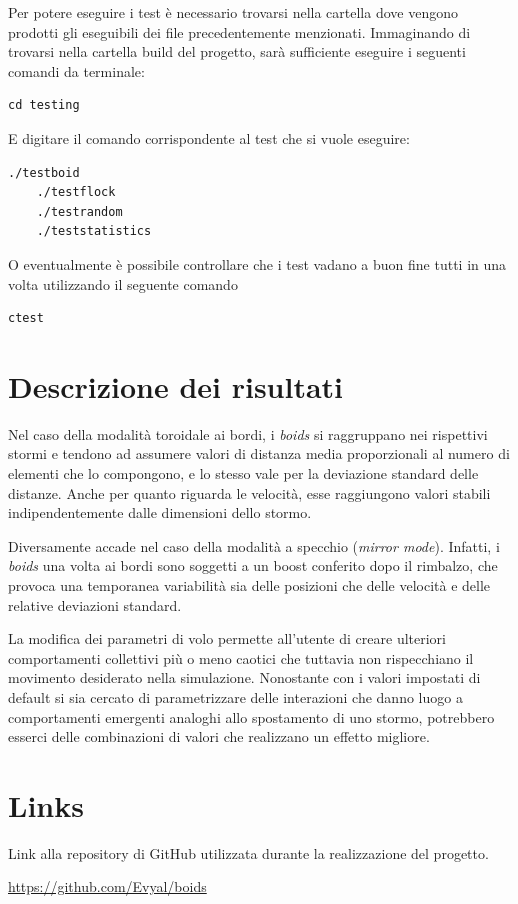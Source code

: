 \documentclass[10pt,a4paper]{article}
\begin{document}
Per potere eseguire i test è necessario trovarsi nella cartella dove vengono prodotti gli eseguibili dei file precedentemente menzionati. Immaginando di trovarsi nella cartella build del progetto, sarà sufficiente eseguire i seguenti comandi da terminale:

\begin{lstlisting}[style=github-bash]
    cd testing
\end{lstlisting}

E digitare il comando corrispondente al test che si vuole eseguire:

\begin{lstlisting}[style=github-bash]
    ./testboid
    ./testflock
    ./testrandom
    ./teststatistics
\end{lstlisting}

O eventualmente è possibile controllare che i test vadano a buon fine tutti in una volta utilizzando il seguente comando

\begin{lstlisting}[style=github-bash]
    ctest
\end{lstlisting}


\section{Descrizione dei risultati}

Nel caso della modalità toroidale ai bordi, i \textit{boids} si raggruppano nei rispettivi stormi e tendono ad assumere valori di distanza media proporzionali al numero di elementi che lo compongono, e lo stesso vale per la deviazione standard delle distanze. Anche per quanto riguarda le velocità, esse raggiungono valori stabili indipendentemente dalle dimensioni dello stormo.

Diversamente accade nel caso della modalità a specchio (\textit{mirror mode}). Infatti, i \textit{boids} una volta ai bordi sono soggetti a un boost conferito dopo il rimbalzo, che provoca una temporanea variabilità sia delle posizioni che delle velocità e delle relative deviazioni standard.

La modifica dei parametri di volo permette all'utente di creare ulteriori comportamenti collettivi più o meno caotici che tuttavia non rispecchiano il movimento desiderato nella simulazione. Nonostante con i valori impostati di default si sia cercato di parametrizzare delle interazioni che danno luogo a comportamenti emergenti analoghi allo spostamento di uno stormo, potrebbero esserci delle combinazioni di valori che realizzano un effetto migliore.

\section{Links}

\setlength{\parindent}{20pt}
Link alla repository di GitHub utilizzata durante la realizzazione del progetto.

\url{https://github.com/Evyal/boids}
\end{document}
